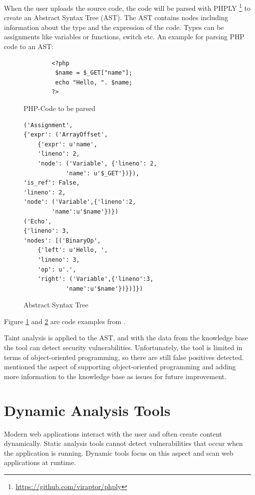 When the user uploads the source code, the code will be parsed with PHPLY \footnote{ \url{https://github.com/viraptor/phply}} to create an Abstract Syntax Tree (AST). The AST contains nodes including information about the type and the expression of the code. Types can be assignments like variables or functions, switch etc. An example for parsing PHP code to an AST:

\begin{figure}[H]
\begin{verbatim}
        <?php
         $name = $_GET["name"];
         echo "Hello, ". $name;
        ?>  
\end{verbatim}
    \caption{PHP-Code to be parsed}
    \label{PHP}
\end{figure}

\begin{figure}[H]
\begin{verbatim}
('Assignment', 
{'expr': ('ArrayOffset',
    {'expr': u'name', 
    'lineno': 2, 
    'node': ('Variable', {'lineno': 2,
            'name': u'$_GET'})}),
'is_ref': False, 
'lineno': 2, 
'node': ('Variable',{'lineno':2,
        'name':u'$name'})}) 
('Echo',
{'lineno': 3, 
'nodes': [('BinaryOp',
    {'left': u'Hello, ', 
    'lineno': 3,
    'op': u'.', 
    'right': ('Variable',{'lineno':3,
            'name':u'$name'})})]})
\end{verbatim}
    \caption{Abstract Syntax Tree}  
    \label{AST}
\end{figure}

Figure \ref{PHP} and \ref{AST} are code examples from \textcite[2-3]{Maskur2019}.

Taint analysis is applied to the AST, and with the data from the knowledge base the tool can detect security vulnerabilities. Unfortunately, the tool is limited in terms of object-oriented programming, so there are still false positives detected. \textcite[]{Maskur2019} mentioned the aspect of supporting object-oriented programming and adding more information to the knowledge base as issues for future improvement.

\section{Dynamic Analysis Tools}
Modern web applications interact with the user and often create content dynamically. Static analysis tools cannot detect vulnerabilities that occur when the application is running. Dynamic tools focus on this aspect and scan web applications at runtime.\newline


